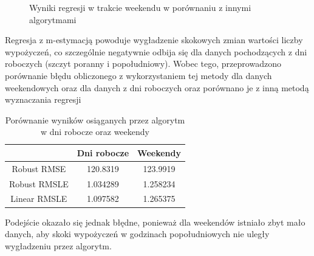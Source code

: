 \documentclass[a4paper,12pt]{article}
\begin{document}
    \begin{figure}[!htb]
        \center
        \caption{Wyniki regresji w trakcie weekendu w porównaniu z innymi algorytmami}
    \end{figure}
    
    Regresja z m-estymacją powoduje wygładzenie skokowych zmian wartości liczby wypożyczeń, co  szczególnie negatywnie odbija się dla danych pochodzących z dni roboczych (szczyt poranny i popołudniowy). Wobec tego, przeprowadzono porównanie błędu obliczonego z wykorzystaniem tej metody dla danych weekendowych oraz dla danych z dni roboczych oraz porównano je z inną metodą wyznaczania regresji

    \begin{table}
    	\centering
        \begin{tabular}{|c|c|c|}
                \hline
                & Dni robocze & Weekendy \\
                \hline
                Robust RMSE & 120.8319 & 123.9919 \\
                \hline
                Robust RMSLE & 1.034289 & 1.258234 \\
                \hline
                Linear RMSLE & 1.097582 & 1.265375 \\
                \hline
        \end{tabular}
        \caption{Porównanie wyników osiąganych przez algorytm w dni robocze oraz weekendy}
    \end{table}
    
    Podejście okazało się jednak błędne, ponieważ dla weekendów istniało zbyt mało danych, aby skoki wypożyczeń w godzinach popołudniowych nie uległy wygładzeniu przez algorytm.
    
\end{document}
